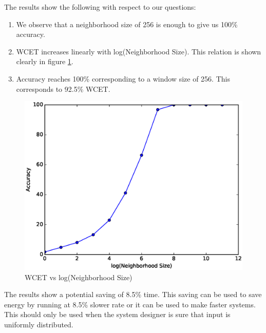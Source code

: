

The results show the following with respect to our questions:

\begin{enumerate}
\item We observe that a neighborhood size of 256 is enough to give us 100\% accuracy.
\item WCET increases linearly with log(Neighborhood Size). This relation is shown clearly in figure \ref{binarysearch2}.
  \item Accuracy reaches 100\% corresponding to a window size of 256. This corresponds to 92.5\% WCET.
\end{enumerate}

\begin{figure}
  \includegraphics[width=0.95\linewidth]{Results/binarysearch1.eps}
  \caption{WCET vs log(Neighborhood Size)}
  \label{binarysearch2}
\end{figure}

The results show a potential saving of 8.5\% time. This saving can be used to save energy by running at 8.5\% slower rate or it can be used to make faster systems. This should only be used when the system designer is sure that input is uniformly distributed.





